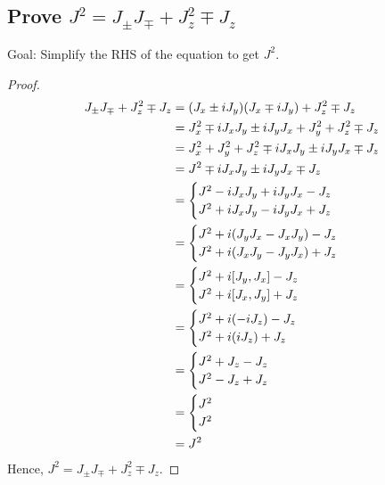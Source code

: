 \documentclass[11pt]{article}
\begin{document}
    \subsection{Prove $J^2 = J_{\pm}J_{\mp} + J^2_z \mp J_z$}
    Goal: Simplify the RHS of the equation to get $J^2$.
    \begin{proof}
      \begin{align*}
        J_{\pm}J_{\mp} + J^2_z \mp J_z &=
        (J_x \pm iJ_y)(J_x \mp iJ_y) + J^2_z \mp J_z \\ &=
        J^2_x \mp iJ_x J_y \pm iJ_y J_x + J^2_y + J^2_z \mp J_z \\&=
        J^2_x + J^2_y + J^2_z \mp iJ_x J_y \pm iJ_y J_x \mp J_z \\ &=
        J^2 \mp iJ_x J_y \pm iJ_y J_x \mp J_z \\ &= \begin{cases}
          J^2 - iJ_x J_y + iJ_y J_x - J_z & \\
          J^2 + iJ_x J_y - iJ_y J_x + J_z &
        \end{cases} \\ &= \begin{cases}
          J^2 + i (J_y J_x - J_x J_y) - J_z & \\
          J^2 + i (J_x J_y - J_y J_x) + J_z &
        \end{cases} \\ &= \begin{cases}
          J^2 + i\commutator{J_y}{J_x} - J_z & \\
          J^2 + i\commutator{J_x}{J_y} + J_z &
        \end{cases} \\ &= \begin{cases}
          J^2 + i(-iJ_z) - J_z & \\
          J^2 + i(iJ_z) + J_z &
        \end{cases} \\ &= \begin{cases}
          J^2 + J_z - J_z & \\
          J^2 - J_z + J_z &
        \end{cases} \\ &= \begin{cases}
          J^2 & \\
          J^2 &
        \end{cases} \\ &=
        J^2
      \end{align*}
    Hence, $J^2 = J_{\pm}J_{\mp} + J^2_z \mp J_z$.
    \end{proof}
    
\end{document}
